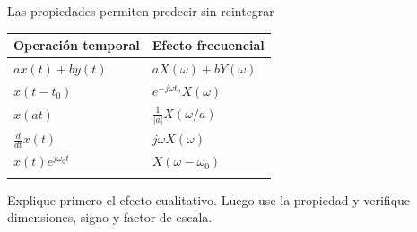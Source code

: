 \documentclass[
  ignorenonframetext,
  aspectratio=169,
  spanish,
  professionalfonts]{beamer}
\newcounter{none} %
\begin{document}
\begin{frame}[shrink]{Las propiedades permiten predecir sin reintegrar}
\protect{}\label{las-propiedades-permiten-predecir-sin-reintegrar}
{\def\LTcaptype{none} %
\begin{longtable}[]{@{}ll@{}}
\toprule\noalign{}
Operación temporal & Efecto frecuencial \\
\midrule\noalign{}
\endhead
\(a x(t)+b y(t)\) & \(aX(\omega)+bY(\omega)\) \\
\(x(t-t_0)\) & \(e^{-j\omega t_0}X(\omega)\) \\
\(x(at)\) & \(\frac{1}{|a|}X(\omega/a)\) \\
\(\frac{d}{dt}x(t)\) & \(j\omega X(\omega)\) \\
\(x(t)e^{j\omega_0t}\) & \(X(\omega-\omega_0)\) \\
\bottomrule\noalign{}
\end{longtable}
}

\begin{tcolorbox}[enhanced jigsaw, arc=.35mm, bottomrule=.15mm, bottomtitle=1mm, breakable, colback=white, colbacktitle=quarto-callout-tip-color!10!white, colframe=quarto-callout-tip-color-frame, coltitle=black, left=2mm, leftrule=.75mm, opacityback=0, opacitybacktitle=0.6, rightrule=.15mm, title={Método de estudio}, titlerule=0mm, toprule=.15mm, toptitle=1mm]

Explique primero el efecto cualitativo. Luego use la propiedad y
verifique dimensiones, signo y factor de escala.

\end{tcolorbox}
\end{frame}
\end{document}

